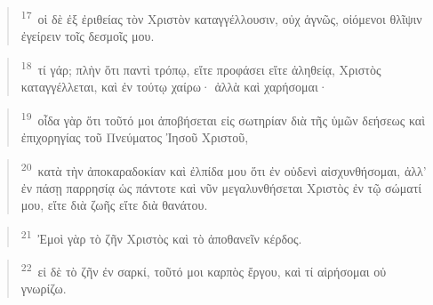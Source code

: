 \documentclass{article}
\newcommand{\currentverse}{1} %
\newcommand{\setcurrentverse}[1]{\renewcommand{\currentverse}{#1}}
\begin{document}
\begin{verse}

\setcurrentverse{17}

\setcounter{footnote}{0}

\textsuperscript{17}~οἱ δὲ ἐξ ἐριθείας τὸν Χριστὸν καταγγέλλουσιν, οὐχ ἁγνῶς, οἰόμενοι θλῖψιν ἐγείρειν τοῖς δεσμοῖς μου.

\end{verse}

\begin{verse}

\setcurrentverse{18}

\setcounter{footnote}{0}

\textsuperscript{18}~τί γάρ; πλὴν ὅτι παντὶ τρόπῳ, εἴτε προφάσει εἴτε ἀληθείᾳ, Χριστὸς καταγγέλλεται, καὶ ἐν τούτῳ χαίρω· ἀλλὰ καὶ χαρήσομαι·

\end{verse}

\begin{verse}

\setcurrentverse{19}

\setcounter{footnote}{0}

\textsuperscript{19}~οἶδα γὰρ ὅτι τοῦτό μοι ἀποβήσεται εἰς σωτηρίαν διὰ τῆς ὑμῶν δεήσεως καὶ ἐπιχορηγίας τοῦ Πνεύματος Ἰησοῦ Χριστοῦ,

\end{verse}

\begin{verse}

\setcurrentverse{20}

\setcounter{footnote}{0}

\textsuperscript{20}~κατὰ τὴν ἀποκαραδοκίαν καὶ ἐλπίδα μου ὅτι ἐν οὐδενὶ αἰσχυνθήσομαι, ἀλλ’ ἐν πάσῃ παρρησίᾳ ὡς πάντοτε καὶ νῦν μεγαλυνθήσεται Χριστὸς ἐν τῷ σώματί μου, εἴτε διὰ ζωῆς εἴτε διὰ θανάτου.

\end{verse}

\begin{verse}

\setcurrentverse{21}

\setcounter{footnote}{0}

\textsuperscript{21}~Ἐμοὶ γὰρ τὸ ζῆν Χριστὸς καὶ τὸ ἀποθανεῖν κέρδος.

\end{verse}

\begin{verse}

\setcurrentverse{22}

\setcounter{footnote}{0}

\textsuperscript{22}~εἰ δὲ τὸ ζῆν ἐν σαρκί, τοῦτό μοι καρπὸς ἔργου, καὶ τί αἱρήσομαι οὐ γνωρίζω.

\end{verse}
\end{document}
